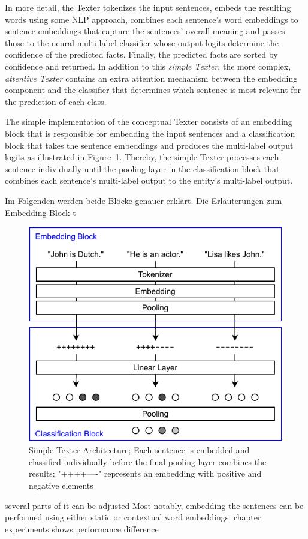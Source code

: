 In more detail, the Texter tokenizes the input sentences, embeds the resulting words using some NLP approach, combines each sentence's word embeddings to sentence embeddings that capture the sentences' overall meaning and passes those to the neural multi-label classifier whose output logits determine the confidence of the predicted facts. Finally, the predicted facts are sorted by confidence and returned. In addition to this \emph{simple Texter}, the more complex, \emph{attentive Texter} contains an extra attention mechanism between the embedding component and the classifier that determines which sentence is most relevant for the prediction of each class.

The simple implementation of the conceptual Texter consists of an embedding block that is responsible for embedding the input sentences and a classification block that takes the sentence embeddings and produces the multi-label output logits as illustrated in Figure~\ref{fig:4_approach/1_texter/1_simple_model/simple_architecture}. Thereby, the simple Texter processes each sentence individually until the pooling layer in the classification block that combines each sentence's multi-label output to the entity's multi-label output.

Im Folgenden werden beide Blöcke genauer erklärt. Die Erläuterungen zum Embedding-Block t

\begin{figure}[t]
    \centering
    \includegraphics{4_approach/1_texter/1_simple_model/simple_architecture}
    \caption{Simple Texter Architecture; Each sentence is embedded and classified individually before the final pooling layer combines the results; "++++----" represents an embedding with positive and negative elements}
    \label{fig:4_approach/1_texter/1_simple_model/simple_architecture}
\end{figure}

several parts of it can be adjusted
Most notably, embedding the sentences can be performed using either static or contextual word embeddings.
chapter experiments shows performance difference
